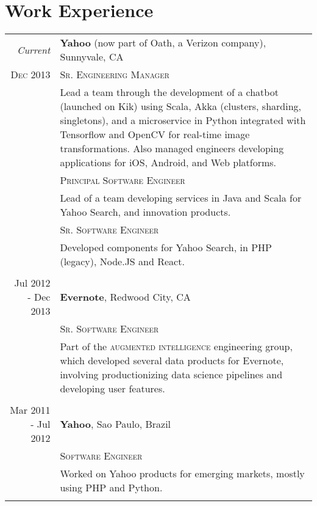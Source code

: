 \documentclass[a4paper,10pt]{article}
\begin{document}
\section{Work Experience}
\begin{tabular}{r|p{11cm}}
 \emph{Current} & \textbf{Yahoo} (now part of Oath, a Verizon company), Sunnyvale, CA \\ \textsc{Dec 2013}
 &\textsc{Sr. Engineering Manager}\\&\footnotesize{

 Lead a team through the development of a chatbot (launched on Kik) using Scala,
 Akka (clusters, sharding, singletons), and a microservice in Python integrated
 with Tensorflow and OpenCV for real-time image transformations. Also managed
 engineers developing applications for iOS, Android, and Web platforms.

 }\\
 &\textsc{Principal Software Engineer}\\&\footnotesize{

 Lead of a team developing services in Java and Scala for Yahoo Search,
 and innovation products.

 }\\
 &\textsc{Sr. Software Engineer}\\&\footnotesize{

 Developed components for Yahoo Search, in PHP (legacy), Node.JS and React.

 }\\

 \multicolumn{2}{c}{} \\

 Jul 2012 - Dec 2013 & \textbf{Evernote}, Redwood City, CA \\
 &\textsc{Sr. Software Engineer}\\&\footnotesize{

 Part of the \textsc{augmented intelligence} engineering group, which developed
 several data products for Evernote, involving productionizing data science
 pipelines and developing user features.

 }\\

 \multicolumn{2}{c}{} \\

 Mar 2011 - Jul 2012 & \textbf{Yahoo}, Sao Paulo, Brazil \\
 &\textsc{Software Engineer}\\&\footnotesize{

 Worked on Yahoo products for emerging markets, mostly using PHP and Python.

 }

 \\\multicolumn{2}{c}{} \\
\end{tabular}
\end{document}
